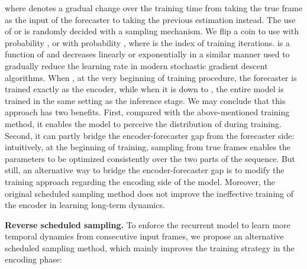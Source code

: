 \documentclass[10pt,journal,compsoc]{IEEEtran}
\newcommand{\myparagraph}[1]{\vspace{5pt} \noindent \textbf{#1.}}
\begin{document}
where  denotes a gradual change over the training time from taking the true frame  as the input of the forecaster to taking the previous estimation  instead. 
The use of  or  is randomly decided with a sampling mechanism. We flip a coin to use  with probability , or  with probability , where  is the index of training iterations. 
 is a function of  and decreases linearly or exponentially in a similar manner used to gradually reduce the learning rate in modern stochastic gradient descent algorithms. 
When , at the very beginning of training procedure, the forecaster is trained exactly as the encoder, while when it is down to , the entire model is trained in the same setting as the inference stage.
We may conclude that this approach has two benefits. First, compared with the above-mentioned training method, it enables the model to perceive the distribution of  during training.
Second, it can partly bridge the encoder-forecaster gap from the forecaster side: intuitively, at the beginning of training, sampling from true frames enables the parameters  to be optimized consistently over the two parts of the sequence. 
But still, an alternative way to bridge the encoder-forecaster gap is to modify the training approach regarding the encoding side of the model.
Moreover, the original scheduled sampling method does not improve the ineffective training of the encoder in learning long-term dynamics.



\myparagraph{Reverse scheduled sampling}
To enforce the recurrent model to learn more temporal dynamics from consecutive input frames, we propose an alternative  scheduled sampling method, which mainly improves the training strategy in the encoding phase:
\end{document}
